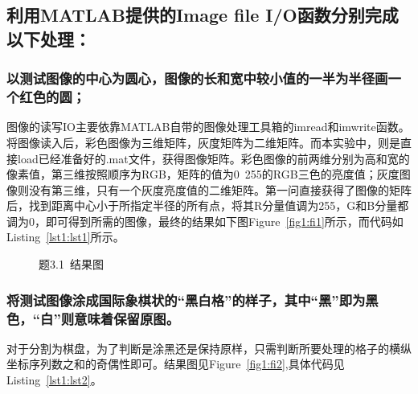 \documentclass[a4paper]{article}
\begin{document}
	\subsection{利用MATLAB提供的Image file I/O函数分别完成以下处理：}
	\subsubsection{以测试图像的中心为圆心，图像的长和宽中较小值的一半为半径画一个红色的圆；}
	
	图像的读写IO主要依靠MATLAB自带的图像处理工具箱的imread和imwrite函数。将图像读入后，彩色图像为三维矩阵，灰度矩阵为二维矩阵。而本实验中，则是直接load已经准备好的.mat文件，获得图像矩阵。彩色图像的前两维分别为高和宽的像素值，第三维按照顺序为RGB，矩阵的值为0~255的RGB三色的亮度值；灰度图像则没有第三维，只有一个灰度亮度值的二维矩阵。第一问直接获得了图像的矩阵后，找到距离中心小于所指定半径的所有点，将其R分量值调为255，G和B分量都调为0，即可得到所需的图像，最终的结果如下图Figure~\ref{fig1:fi1}所示，而代码如Listing~\ref{lst1:lst1}所示。
	
	\begin{figure}[b]
			\centering
			\hspace{0.75cm}
			\caption{题3.1~结果图}
			\label{fig1}
	\end{figure}
	

	\subsubsection{将测试图像涂成国际象棋状的“黑白格”的样子，其中“黑”即为黑色，“白”则意味着保留原图。}
	对于分割为棋盘，为了判断是涂黑还是保持原样，只需判断所要处理的格子的横纵坐标序列数之和的奇偶性即可。结果图见Figure~\ref{fig1:fi2},具体代码见Listing~\ref{lst1:lst2}。
	
\end{document}
